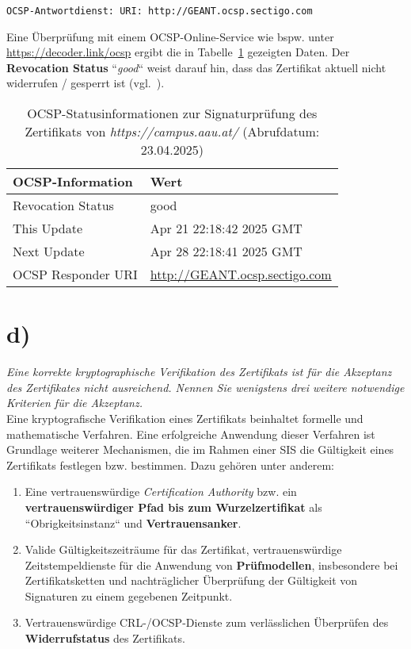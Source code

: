\begin{center}
    \texttt{OCSP-Antwortdienst: URI: http://GEANT.ocsp.sectigo.com}
\end{center}

\noindent
Eine Überprüfung mit einem OCSP-Online-Service wie bspw. unter \url{https://decoder.link/ocsp} ergibt die in Tabelle~\ref{tab:ocsp} gezeigten Daten. Der \textbf{Revocation Status} ``\textit{good}`` weist darauf hin, dass das Zertifikat aktuell nicht widerrufen / gesperrt ist (vgl.~\cite[37]{ITS6}).


\begin{table}[h]
    \setlength{\tabcolsep}{0.5em}
    \def\arraystretch{1.5}
    \centering
    \begin{tabular}{|l|l|}
        \hline
        \textbf{OCSP-Information}     & \textbf{Wert} \\
        \hline
        Revocation Status             & good \\
        \hline
        This Update                   & Apr 21 22:18:42 2025 GMT \\
        \hline
        Next Update                   & Apr 28 22:18:41 2025 GMT \\
        \hline
        OCSP Responder URI            & \url{http://GEANT.ocsp.sectigo.com} \\
        \hline
    \end{tabular}
    \caption{OCSP-Statusinformationen zur Signaturprüfung des Zertifikats von \textit{https://campus.aau.at/} (Abrufdatum: 23.04.2025)}
    \label{tab:ocsp}
\end{table}


\section{d)}

\textit{Eine korrekte kryptographische Verifikation des Zertifikats ist für die Akzeptanz
des Zertifikates nicht ausreichend. Nennen Sie wenigstens drei weitere notwendige Kriterien für die Akzeptanz.}\\

\noindent
Eine kryptografische Verifikation eines Zertifikats beinhaltet formelle und mathematische Verfahren.
Eine erfolgreiche Anwendung dieser Verfahren ist Grundlage weiterer Mechanismen, die im Rahmen einer SIS die Gültigkeit eines Zertifikats festlegen bzw. bestimmen.
Dazu gehören unter anderem:

\begin{enumerate}
    \itemsep0.5em
    \item Eine vertrauenswürdige \textit{Certification Authority} bzw. ein \textbf{vertrauenswürdiger Pfad bis zum Wurzelzertifikat} als ``Obrigkeitsinstanz`` und \textbf{Vertrauensanker}.
    \item Valide Gültigkeitszeiträume für das Zertifikat, vertrauenswürdige Zeitstempeldienste für die Anwendung von \textbf{Prüfmodellen}, insbesondere bei Zertifikatsketten und nachträglicher Überprüfung der Gültigkeit von Signaturen zu einem gegebenen Zeitpunkt.
    \item Vertrauenswürdige CRL-/OCSP-Dienste zum verlässlichen Überprüfen des \textbf{Widerrufstatus} des Zertifikats.
\end{enumerate}
